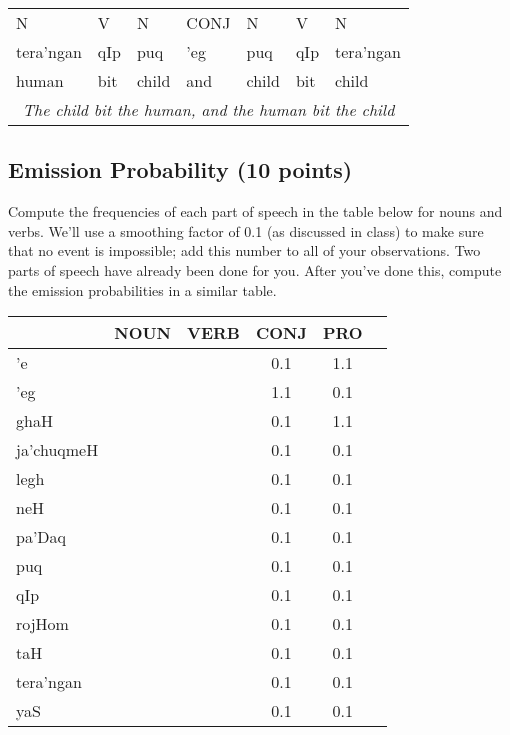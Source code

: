 \documentclass[11pt]{article}
\begin{document}
\begin{tabular}{lllllll}
N         & V      & N     & CONJ & N         & V    & N \\
tera'ngan & qIp   & puq   & 'eg  & puq & qIp  & tera'ngan \\
human     & bit  & child & and  & child & bit & child \\
\multicolumn{7}{c}{{\em The child bit the human, and the human bit the child}}
\end{tabular}

\subsection{Emission Probability (10 points)}

Compute the frequencies of each part of speech in the table below for
nouns and verbs.  We'll use a smoothing factor of 0.1 (as discussed in
class) to make sure that no event is impossible; add this number to
all of your observations.  Two parts of speech have already been
done for you.  After you've done this, compute the emission probabilities in a similar table.

\begin{center}
\begin{tabular}{|l|c|c|c|c|c|}
\hline
   & NOUN & VERB & CONJ & PRO \\
\hline
'e &   &   &  0.1    &  1.1   \\
\hline
'eg &     &     &  1.1    &  0.1 \\
\hline
ghaH &     &    &  0.1    &  1.1  \\
\hline
ja'chuqmeH &     &     &  0.1    &  0.1   \\
\hline
legh &     &     &  0.1    &  0.1 \\
\hline
neH &     &     &  0.1    &  0.1   \\
\hline
pa'Daq &     &     &  0.1    &  0.1 \\
\hline
puq &     &     &  0.1    &  0.1 \\
\hline
qIp &     &     &  0.1    &  0.1 \\
\hline
rojHom &     &     &  0.1    &  0.1\\
\hline
taH &     &     &  0.1    &  0.1 \\
\hline
tera'ngan &     &     &  0.1    &  0.1 \\
\hline
yaS &     &     &  0.1    &  0.1   \\
\hline
\end{tabular}
\end{center}
\end{document}
